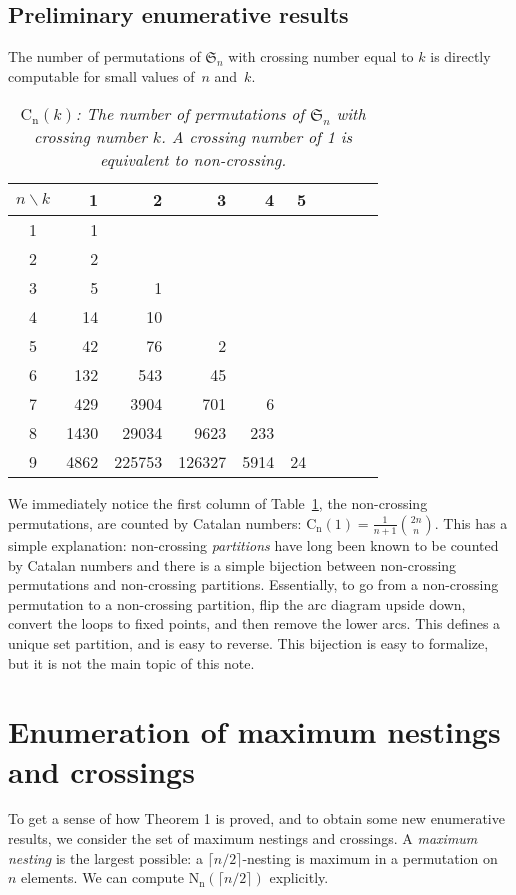 \documentclass{amsart}
\begin{document}
\subsection{Preliminary enumerative results}
The number of permutations of ${\mathfrak{S}_n}$ with crossing number equal to $k$ is directly computable for small values of~$n$ and~$k$. 
\begin{table}[h!]\center
\begin{tabular}{c|rrrrrrrrr}
$n\backslash k$ & 1 & 2 & 3 & 4 & 5\\ \hline
1&1\\
2& 2 &\\
3& 5& 1\\
4 & 14 & 10 &   \\
5 & 42 & 76&2 \\
6 & 132& 543& 45 \\
7 & 429& 3904& 701& 6 \\
8 & 1430& 29034&9623& 233\\
9 & 4862& 225753& 126327& 5914& 24\\
\end{tabular}
\smallskip
\caption{\it ${\operatorname{C_n}}(k)$: The number of permutations of ${\mathfrak{S}_n}$ with crossing number $k$. A crossing number of 1 is equivalent to non-crossing. }
\label{tab:enum}
\end{table}

We immediately notice the first column of Table~\ref{tab:enum}, the non-crossing permutations,  are counted by Catalan numbers: ${\operatorname{C_n}}(1)=\frac{1}{n+1}\binom{2n}{n}$. This has a simple explanation: non-crossing \emph{ partitions\/} have long been known to be counted by Catalan numbers and there is a simple bijection between non-crossing permutations and non-crossing partitions. 
Essentially, to go from a non-crossing permutation to a non-crossing partition, flip the arc diagram upside down, convert the loops to fixed points,  and then remove the lower arcs. This defines a unique set  partition, and is easy to reverse. This bijection is easy to formalize, but it is not the main topic of this note. 
 
\section{Enumeration of maximum nestings and crossings }
To get a sense of how Theorem 1 is proved, and to obtain some new enumerative results, we consider the set of maximum nestings and crossings. A \emph{maximum nesting} is the largest possible: a $\lceil n/2\rceil$-nesting is maximum in a permutation on~$n$ elements. We can compute ${\operatorname{N_n}}( \lceil n/2\rceil )$ explicitly. 
\end{document}
